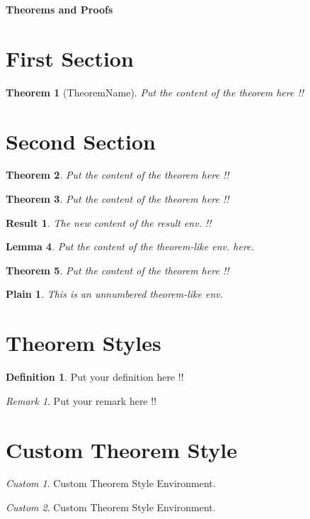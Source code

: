 \documentclass{article}
\newtheorem{theorem}{Theorem}[section]
\newtheorem{result}{Result}[theorem]
\newtheorem{lemma}[theorem]{Lemma}
\newtheorem*{plain}{Plain}
\theoremstyle{definition}
\newtheorem{definition}{Definition}[section]
\theoremstyle{remark}
\newtheorem{remark}{Remark}
\theoremstyle{myStyle}
\newtheorem{custom}{Custom}
\begin{document}
	{
		\noindent
		\Huge
		\textbf{Theorems and Proofs}	
	}

	\vspace{1cm}
	
	\section{First Section}
	\begin{theorem}[TheoremName]
		Put the content of the theorem here !!
	\end{theorem}
	
	\section{Second Section}	
	\begin{theorem}
		Put the content of the theorem here !!
	\end{theorem}
	\begin{theorem}
		Put the content of the theorem here !!
	\end{theorem}
	
	\begin{result}
		The new content of the result env. !!
	\end{result}
	
	\begin{lemma}
		Put the content of the theorem-like env. here.
	\end{lemma}
	
	\begin{theorem}
		Put the content of the theorem here !!
	\end{theorem}
	
	\begin{plain}
		This is an unnumbered theorem-like env.
	\end{plain}
	
	\section{Theorem Styles}
	\begin{definition}
		Put your definition here !!
	\end{definition}
	\begin{remark}
		Put your remark here !!
	\end{remark}
	
	\section{Custom Theorem Style}
	\begin{custom}
		Custom Theorem Style Environment.
	\end{custom}
	\begin{custom}
		Custom Theorem Style Environment.
	\end{custom}
	
\end{document}
